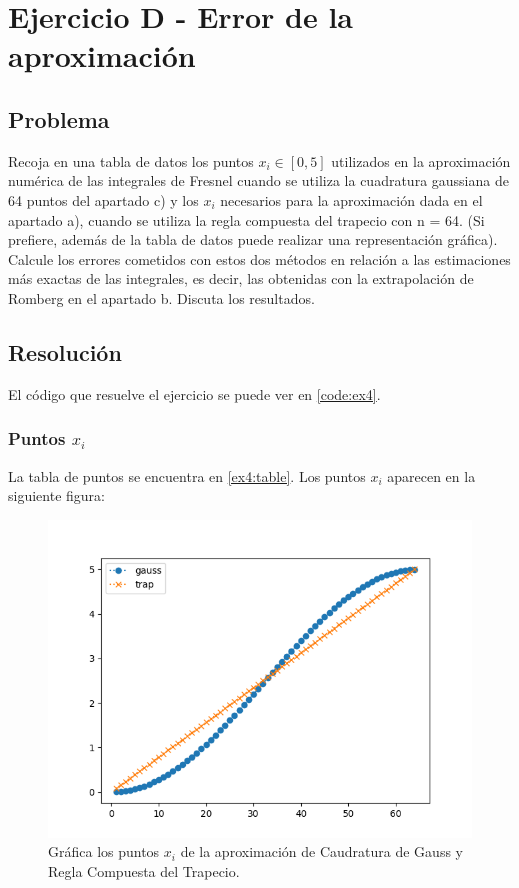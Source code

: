 \section{Ejercicio D - Error de la aproximación}

\subsection{Problema}

Recoja en una tabla de datos los puntos $x_i \in [0, 5]$ utilizados en la aproximación numérica de las integrales de Fresnel cuando se utiliza la cuadratura gaussiana de 64 puntos del apartado c) y los $x_i$ necesarios para la aproximación dada en el apartado a), cuando se utiliza la regla compuesta del trapecio con n = 64. (Si prefiere, además de la tabla de datos puede realizar una representación gráfica). Calcule los errores cometidos con estos dos métodos en relación a las estimaciones más exactas de las integrales, es decir, las obtenidas con la extrapolación de Romberg en el apartado b. Discuta los resultados.

\subsection{Resolución}


El código que resuelve el ejercicio se puede ver en \ref{code:ex4}. 

\subsubsection{Puntos $x_i$}

La tabla de puntos se encuentra en \ref{ex4:table}. Los puntos $x_i$ aparecen en la siguiente figura: 

\begin{figure}[h!]
	\centering
	\includegraphics[width=0.8\linewidth]{figures/gauss_trap_xi.png}
	\caption{Gráfica los puntos $x_i$ de la aproximación de Caudratura de Gauss y Regla Compuesta del Trapecio.}
	\label{fig:gauss_trap_xi}
\end{figure}

